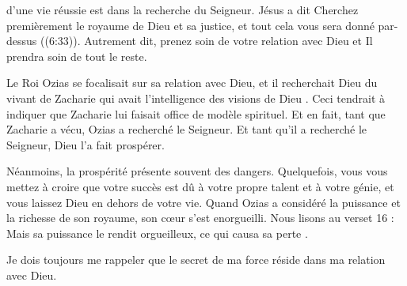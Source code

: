 



 d'une vie réussie est dans la recherche du Seigneur.
 Jésus a dit \og Cherchez premièrement le royaume de Dieu et sa justice,
 et tout cela vous sera donné par-dessus \fg{} ((6:33)).
 Autrement dit, prenez soin de votre relation avec Dieu et Il prendra soin
 de tout le reste. 

Le Roi Ozias se focalisait sur sa relation avec Dieu,
 et \og il recherchait Dieu du vivant de Zacharie qui avait l'intelligence
 des visions de Dieu \fg.
 Ceci tendrait à indiquer que Zacharie lui faisait office de modèle spirituel.
 Et en fait, tant que Zacharie a vécu, Ozias a recherché le Seigneur.
 Et tant qu'il a recherché le Seigneur, Dieu l'a fait prospérer.


Néanmoins, la prospérité présente souvent des dangers.
 Quelquefois, vous vous mettez à croire que votre succès est dû à votre propre
 talent et à votre génie, et vous laissez Dieu en dehors de votre vie.
 Quand Ozias a considéré la puissance et la richesse de son royaume,
 son cœur s'est enorgueilli.
 Nous lisons au verset 16 : \og Mais sa puissance le rendit orgueilleux,
 ce qui causa sa perte \fg{} \BFC.

Je dois toujours me rappeler que le secret de ma force réside
 dans ma relation avec Dieu. 

\dvrule








